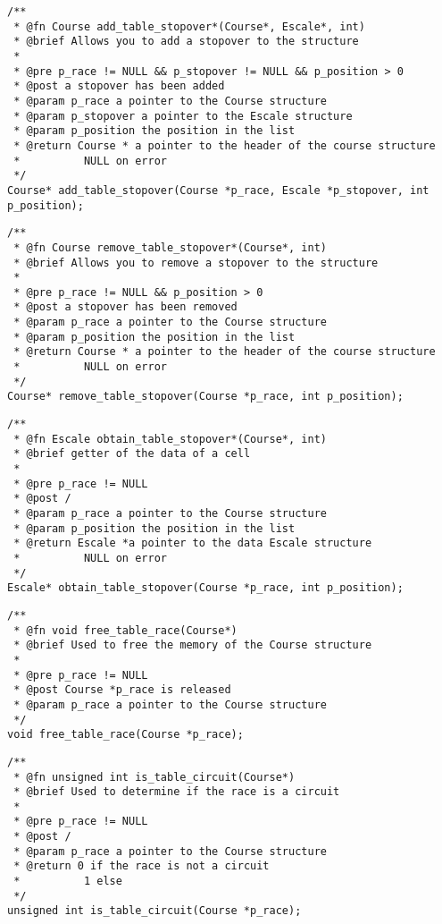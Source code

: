 \documentclass[a4paper, 11pt, oneside]{article}
\begin{document}
\newpage

		\begin{lstlisting}
/**
 * @fn Course add_table_stopover*(Course*, Escale*, int)
 * @brief Allows you to add a stopover to the structure
 *
 * @pre p_race != NULL && p_stopover != NULL && p_position > 0
 * @post a stopover has been added
 * @param p_race a pointer to the Course structure
 * @param p_stopover a pointer to the Escale structure
 * @param p_position the position in the list
 * @return Course * a pointer to the header of the course structure
 * 			NULL on error
 */
Course* add_table_stopover(Course *p_race, Escale *p_stopover, int p_position);
		\end{lstlisting}

		\begin{lstlisting}
/**
 * @fn Course remove_table_stopover*(Course*, int)
 * @brief Allows you to remove a stopover to the structure
 *
 * @pre p_race != NULL && p_position > 0
 * @post a stopover has been removed
 * @param p_race a pointer to the Course structure
 * @param p_position the position in the list
 * @return Course * a pointer to the header of the course structure
 * 			NULL on error
 */
Course* remove_table_stopover(Course *p_race, int p_position);
		\end{lstlisting}

		\begin{lstlisting}
/**
 * @fn Escale obtain_table_stopover*(Course*, int)
 * @brief getter of the data of a cell
 *
 * @pre p_race != NULL
 * @post /
 * @param p_race a pointer to the Course structure
 * @param p_position the position in the list
 * @return Escale *a pointer to the data Escale structure
 * 			NULL on error
 */
Escale* obtain_table_stopover(Course *p_race, int p_position);
		\end{lstlisting}

		\begin{lstlisting}
/**
 * @fn void free_table_race(Course*)
 * @brief Used to free the memory of the Course structure
 *
 * @pre p_race != NULL
 * @post Course *p_race is released
 * @param p_race a pointer to the Course structure
 */
void free_table_race(Course *p_race);
		\end{lstlisting}

\newpage

		\begin{lstlisting}
/**
 * @fn unsigned int is_table_circuit(Course*)
 * @brief Used to determine if the race is a circuit
 *
 * @pre p_race != NULL
 * @post /
 * @param p_race a pointer to the Course structure
 * @return 0 if the race is not a circuit
 * 			1 else
 */
unsigned int is_table_circuit(Course *p_race);
		\end{lstlisting}
\end{document}
